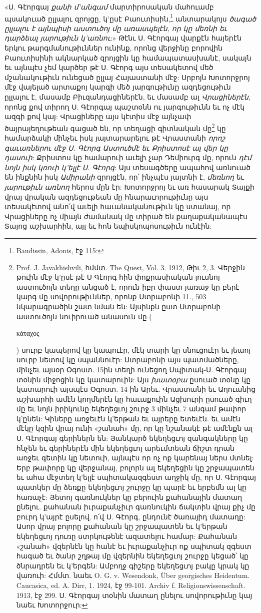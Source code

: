 \documentclass{article}
\begin{document}
{«Ս. Գէորգայ \emph{քանի մ'անգամ} մարտիրոսական մահուամբ պսակուած ըլլալու զրոյցը, կ'ըսէ Բաուտիսին,\footnote{Baudissin, Adonis, էջ 115:} անտարակոյս \emph{ծագած ըլլալու է այնպիսի աստուծոյ մը առասպելէն, որ կը մեռնի եւ դարձեալ յարութիւն կ'առնու}:» Թէնւ Ս. Գէորգայ վարքէն հայերէն երկու թարգմանութիւններ ունինք, որոնց վերջինը բորովին Բաուտիսինի ակնարկած զրոյցին կը համապատասխանէ, սակայն եւ այնպէս չեմ կարծեր թէ Ս. Գէորգ այս տեսակետով մեծ մշանակութիւն ունեցած ըլլայ Հայաստանի մէջ: Սրբոյն Խոտորջրոյ մէջ վայելած արտաքոյ կարգի մեծ յարգութիւնը ազդեցութիւն ըլլալու է, մասամբ Բիւզանդացիներէն, եւ մասամբ ալ \emph{Վրացիներէն}, որոնց քով տիրող Ս. Գէորգայ պաշտօնն ու յարգութիւնն եւ ոչ մէկ ազգի քով կայ: Վրացիները այս կէտիս մէջ այնչափ ծայրայեղութեան գացած են, որ տեղացի գիտնական մը\footnote{Prof. J. Javakhishvili, հմմտ. The Quest, Vol. 3. 1912, Թիւ 2, 3. Վերջին թուին մէջ կ'ըսէ թէ Ս Գէորգ հին փոքրասիական լուսնոյ աստուծոյն տեղը անցած է, որուն իբր փաստ յառաջ կը բերէ կարգ մը սովորութիւններ, որոնք Ստրաբոնի 11., 503 նկարագրածին շատ նման են: Այսինքն ըստ Ստրաբոնի աստուծոյն նուիրուած անասուն մը (\begin{greek}κάταχος\end{greek}) սուրբ կապերով կը կապուէր, մէկ տարի կը սնուցուէր եւ յեաոյ սուրբ նետով կը սպաննուէր: Ստրաբոնի այս պատմածները, մինչեւ այսօր Օգոստ. 15ին տեղի ունեցող Սպիտակ-Ս. Գէորգայ տօնին միջոցին կը կատարուին: Այս \emph{խատօբա} ըսուած տօնը կը կատարուի այսպէս Օգոստ. 14 ին Արեւ. Վրաստանի եւ Աղուանից աշխարհի ամէն կողմերէն կը հաւաքուին Ացխուրի ըսուած գիւղ մը եւ նոյն իրիկունը եկեղեցւոյ շուրջ 3 մինչեւ 7 անգամ թափոր կ'ընեն: Կիները առջեւէն կ'երթան եւ այրերը ետեւէն. եւ ամէն մէկը կզին վրայ ունի «շանահ» մը, որ կը նշանակէ թէ ամէնքն ալ Ս. Գէորգայ գերիներն են: Յանկարծ եկեղեցւոյ զանգակները կը հնչեն եւ գերիներէն մին եկեղեցւոյ արեւմտեան ճիշտ դրան առջեւ գետին կը նետուի, այնպէս որ ոչ ոք կարենայ ներս մտնել: Երբ թափորը կը վերջանայ, բոլորն ալ եկեղեցին կը շրջապատեն եւ ահա մէջտեղ կ'ելլէ սպիտակազգեստ աղջիկ մը, որ Ս. Գէորգայ պատկեր մը ձեռքը եկեղեցւոյ շուրջը կը պարէ եւ երբեմն ալ կը հառաչէ: Յետոյ գառնուկներ կը բերուին քահանային մատաղ ընելու. քահանան իւրաքանչիւր գառնուկին ճակտին վրայ քիչ մը բուրդ կ'այրէ ըսելով. ո՛վ Ս. Գէորգ, ընդունէ ծառայիդ մատաղը: Ասոր վրայ բոլորը քահանան կը շրջապատեն եւ կ'երթան եկեղեցւոյ դուռը ստրկութենէ ազատելու համար: Քահանան «շանահ» վզերնէն կը հանէ եւ իւրաքանչիւր ոք սպիտակ զգեստ հագած եւ ծանր շղթայ մը վզերնին եկեղեցւոյ շուրջը կեցած՝ կը ծնրադրեն եւ կ'երգեն: Ամբողջ գիշերը եկեղեցւոյ բակը կրակ կը վառուի: Հմմտ. նաեւ O. G. v. Wesendonk, Über georgisches Heidentum. Caucasica, ed. A. Dirr, 1. 1924, էջ 99-101. Archiv f. Religionswissenschaft. 1913, էջ 299. Ս. Գէորգայ տօնին մատաղ ընելու սովորութիւնը կայ նաեւ Խոտորջուր:} կը համարձակի մինչեւ իսկ յայտարարելու թէ Վրաստանի \emph{որոշ գաւառներու մէջ Ս. Գէորգ Աստուծմէ եւ Քրիստոսէ ալ վեր կը դասուի}: Քրիստոս կը համարուի աւելի չար Դեմիուրգ մը, որուն \emph{դէմ նոյն իսկ կռուի կ'ելլէ Ս. Գէորգ}: Այս տեսագծերը ապահով առնուած են ինքնին իսկ \emph{Ամիրանի} զրոյցէն, որ՝ ինչպէս յայտնի է, \emph{մեռնող} եւ \emph{յարութիւն առնող} հերոս մըն էր: Խոտորջրոյ եւ առ հասարակ Տայքի վրայ վրական ազդեցութեան մը հնարաւորութիւնը այս տեսակէտով անո՛վ աւելի հաւանականութիւն կը ստանայ, որ Վրացիները ոչ միայն ժամանակ մը տիրած են քաղաքականապէս Տայոց աշխարհին, այլ եւ հոն եպիսկոպոսութիւն ունէին:

}
\end{document}
